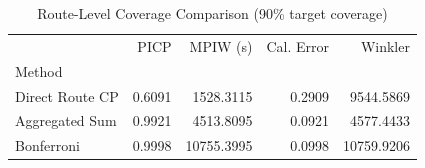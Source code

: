 \begin{table}
\caption{Route-Level Coverage Comparison (90\% target coverage)}
\label{tab:t61_route_coverage}
\begin{tabular}{lrrrr}
\toprule
 & PICP & MPIW (s) & Cal. Error & Winkler \\
Method &  &  &  &  \\
\midrule
Direct Route CP & 0.6091 & 1528.3115 & 0.2909 & 9544.5869 \\
Aggregated Sum & 0.9921 & 4513.8095 & 0.0921 & 4577.4433 \\
Bonferroni & 0.9998 & 10755.3995 & 0.0998 & 10759.9206 \\
\bottomrule
\end{tabular}
\end{table}

